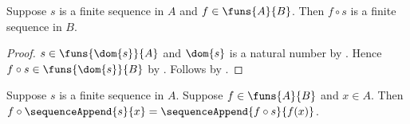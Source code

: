 \begin{proposition}\label{spike_map_finite_sequence}
    Suppose $s$ is a finite sequence in $A$ and $f\in\funs{A}{B}$.
    Then $f\circ s$ is a finite sequence in $B$.
\end{proposition}
\begin{proof}
    $s\in\funs{\dom{s}}{A}$ and $\dom{s}$ is a natural number by
        .
    Hence $f\circ s\in\funs{\dom{s}}{B}$ by .
    Follows by .
\end{proof}

\begin{proposition}\label{spike_map_sequence_append}
    Suppose $s$ is a finite sequence in $A$.
    Suppose $f\in\funs{A}{B}$ and $x\in A$.
    Then
        $f\circ\sequenceAppend{s}{x}
            =\sequenceAppend{f\circ s}{f(x)}$.
\end{proposition}
